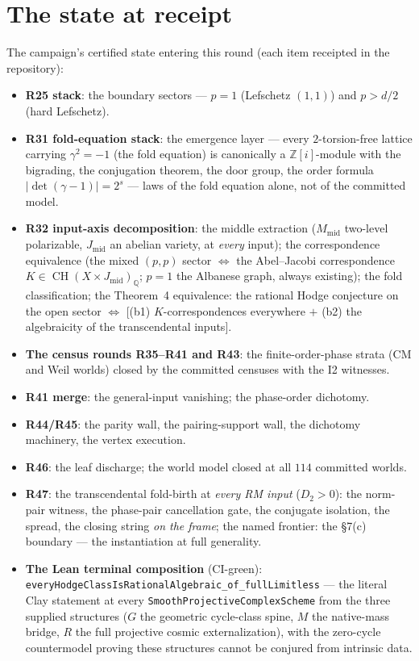 \documentclass[11pt]{article}
\newcommand{\Z}{\mathbb Z}
\newcommand{\Q}{\mathbb Q}
\newcommand{\CH}{\operatorname{CH}}
\begin{document}
\section{The state at receipt}

The campaign's certified state entering this round (each item
receipted in the repository):

\begin{itemize}
\item \textbf{R25 stack}: the boundary sectors --- $p=1$
(Lefschetz $(1,1)$) and $p>d/2$ (hard Lefschetz).
\item \textbf{R31 fold-equation stack}: the emergence layer --- every
$2$-torsion-free lattice carrying $\gamma^2=-1$ (the fold equation) is
canonically a $\Z[i]$-module with the bigrading, the conjugation
theorem, the door group, the order formula $|\det(\gamma-1)|=2^s$ ---
laws of the fold equation alone, not of the committed model.
\item \textbf{R32 input-axis decomposition}: the middle extraction
($M_{\mathrm{mid}}$ two-level polarizable, $J_{\mathrm{mid}}$ an
abelian variety, at \emph{every} input); the correspondence
equivalence (the mixed $(p,p)$ sector $\iff$ the Abel--Jacobi
correspondence $K\in\CH(X\times J_{\mathrm{mid}})_\Q$; $p=1$ the
Albanese graph, always existing); the fold classification; the
Theorem~4 equivalence: the rational Hodge conjecture on the open
sector $\iff$ [(b1) $K$-correspondences everywhere $+$ (b2) the
algebraicity of the transcendental inputs].
\item \textbf{The census rounds R35--R41 and R43}: the
finite-order-phase strata (CM
and Weil worlds) closed by the committed censuses with the I2
witnesses.
\item \textbf{R41 merge}: the general-input vanishing; the phase-order
dichotomy.
\item \textbf{R44/R45}: the parity wall, the pairing-support wall, the
dichotomy machinery, the vertex execution.
\item \textbf{R46}: the leaf discharge; the world model closed at all
$114$ committed worlds.
\item \textbf{R47}: the transcendental fold-birth at \emph{every RM
input} ($D_2>0$): the norm-pair witness, the phase-pair cancellation
gate, the conjugate isolation, the spread, the closing string
\emph{on the frame}; the named frontier: the \S7(c) boundary --- the
instantiation at full generality.
\item \textbf{The Lean terminal composition} (CI-green):
\texttt{everyHodgeClassIsRationalAlgebraic\_of\_fullLimitless} ---
the literal Clay statement at every
\texttt{SmoothProjectiveComplexScheme} from the three supplied
structures ($G$ the geometric cycle-class spine, $M$ the native-mass
bridge, $R$ the full projective cosmic externalization), with the
zero-cycle countermodel proving these structures cannot be conjured
from intrinsic data.
\end{itemize}
\end{document}
